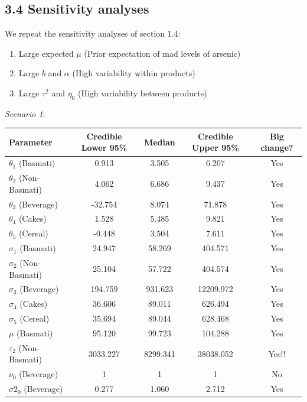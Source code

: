 \documentclass[]{article}
\begin{document}
\subsection{3.4 Sensitivity analyses}

We repeat the sensitivity analyses of section 1.4:

\begin{enumerate}
  \item Large expected $\mu$ (Prior expectation of mad levels of arsenic)
  \item Large $b$ and $\alpha$ (High variability within products)
  \item Large $\tau^2$ and $\eta_0$ (High variability between products)
\end{enumerate}

\textit{Scenario 1}:

\begin{center}
  \begin{tabular}{l c c c c}
  \hline Parameter & Credible Lower 95\% & Median & Credible Upper 95\% & Big change?  \\ \hline
    $\theta_1$ (Basmati) & 0.913 & 3.505 & 6.207 & Yes\\ 
    $\theta_2$ (Non-Basmati) & 4.062 & 6.686 & 9.437 & Yes \\
    $\theta_3$ (Beverage) & -32.754 & 8.074 & 71.878 & Yes \\
    $\theta_4$ (Cakes) & 1.528 & 5.485 & 9.821 & Yes \\
    $\theta_5$ (Cereal) & -0.448 & 3.504 & 7.611 & Yes \\ \hline
    $\sigma_1$ (Basmati) & 24.947 & 58.269 & 404.571 & Yes \\ 
    $\sigma_2$ (Non-Basmati) & 25.104 & 57.722 & 404.574 & Yes  \\
    $\sigma_3$ (Beverage) & 194.759 & 931.623 & 12209.972 & Yes  \\
    $\sigma_4$ (Cakes) & 36.606 & 89.011 & 626.494 & Yes  \\
    $\sigma_5$ (Cereal) & 35.694 & 89.044 & 628.468 & Yes  \\ \hline
    $\mu$ (Basmati) & 95.120  & 99.723 & 104.288 & Yes  \\ 
    $\tau_2$ (Non-Basmati) & 3033.227 & 8299.341 & 38038.052 & Yes!!  \\
    $\nu_0$ (Beverage) & 1 & 1 & 1 & No \\
    $\sigma2_0$ (Beverage) & 0.277 & 1.060 & 2.712  & Yes \\ \hline
  \end{tabular}
\end{center}
\end{document}
